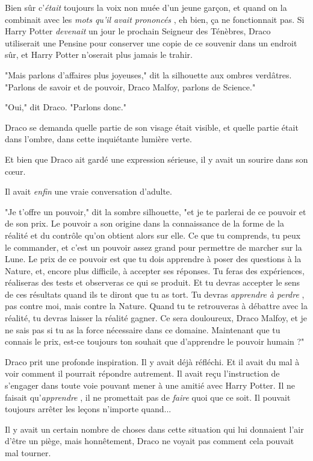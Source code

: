 Bien sûr c'\emph{était}  toujours la voix non muée d'un jeune garçon, et quand on la combinait avec les \emph{mots qu'il avait prononcés} , eh bien, ça ne fonctionnait pas. Si Harry Potter \emph{devenait}  un jour le prochain Seigneur des Ténèbres, Draco utiliserait une Pensine pour conserver une copie de ce souvenir dans un endroit sûr, et Harry Potter n'oserait plus jamais le trahir.

"Mais parlons d'affaires plus joyeuses," dit la silhouette aux ombres verdâtres. "Parlons de savoir et de pouvoir, Draco Malfoy, parlons de Science."

"Oui," dit Draco. "Parlons donc."

Draco se demanda quelle partie de son visage était visible, et quelle partie était dans l'ombre, dans cette inquiétante lumière verte.

Et bien que Draco ait gardé une expression sérieuse, il y avait un sourire dans son cœur.

Il avait \emph{enfin}  une vraie conversation d'adulte.

"Je t'offre un pouvoir," dit la sombre silhouette, "et je te parlerai de ce pouvoir et de son prix. Le pouvoir a son origine dans la connaissance de la forme de la réalité et du contrôle qu'on obtient alors sur elle. Ce que tu comprends, tu peux le commander, et c'est un pouvoir assez grand pour permettre de marcher sur la Lune. Le prix de ce pouvoir est que tu dois apprendre à poser des questions à la Nature, et, encore plus difficile, à accepter ses réponses. Tu feras des expériences, réaliseras des tests et observeras ce qui se produit. Et tu devras accepter le sens de ces résultats quand ils te diront que tu as tort. Tu devras \emph{apprendre à perdre} , pas contre moi, mais contre la Nature. Quand tu te retrouveras à débattre avec la réalité, tu devras laisser la réalité gagner. Ce sera douloureux, Draco Malfoy, et je ne sais pas si tu as la force nécessaire dans ce domaine. Maintenant que tu connais le prix, est-ce toujours ton souhait que d'apprendre le pouvoir humain ?"

Draco prit une profonde inspiration. Il y avait déjà réfléchi. Et il avait du mal à voir comment il pourrait répondre autrement. Il avait reçu l'instruction de s'engager dans toute voie pouvant mener à une amitié avec Harry Potter. Il ne faisait qu'\emph{apprendre} , il ne promettait pas de \emph{faire}  quoi que ce soit. Il pouvait toujours arrêter les leçons n'importe quand...

Il y avait un certain nombre de choses dans cette situation qui lui donnaient l'air d'être un piège, mais honnêtement, Draco ne voyait pas comment cela pouvait mal tourner.

